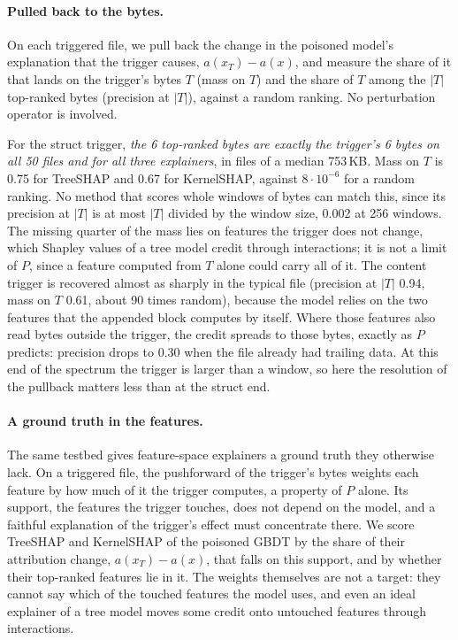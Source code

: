 \paragraph{Pulled back to the bytes.} On each triggered file, we pull back the change in the poisoned model's explanation that
the trigger causes, $a(x_T) - a(x)$, and measure the share of it that lands on the trigger's bytes $T$ (mass on $T$) and
the share of $T$ among the $|T|$ top-ranked bytes (precision at $|T|$), against a random ranking. No perturbation
operator is involved.

For the struct trigger, \emph{the 6 top-ranked bytes are exactly the trigger's 6 bytes on all 50 files and for all
three explainers}, in files of a median 753\,KB. Mass on $T$ is 0.75 for TreeSHAP and 0.67 for KernelSHAP, against
$8 \cdot 10^{-6}$ for a random ranking. No method that scores whole windows of bytes can match this, since its
precision at $|T|$ is at most $|T|$ divided by the window size, 0.002 at 256 windows. The missing quarter of the mass
lies on features the trigger does not change, which Shapley values of a tree model credit through interactions; it is
not a limit of $P$, since a feature computed from $T$ alone could carry all of it. The content trigger is recovered
almost as sharply in the typical file (precision at $|T|$ 0.94, mass on $T$ 0.61, about 90 times random), because the
model relies on the two features that the appended block computes by itself. Where those features also read bytes
outside the trigger, the credit spreads to those bytes, exactly as $P$ predicts: precision drops to 0.30 when the file
already had trailing data. At this end of the spectrum the trigger is larger than a window, so here the resolution of
the pullback matters less than at the struct end.

\paragraph{A ground truth in the features.} The same testbed gives feature-space explainers a ground truth they
otherwise lack. On a triggered file, the pushforward of the
trigger's bytes weights each feature by how much of it the trigger computes, a property of $P$ alone. Its support, the
features the trigger touches, does not depend on the model, and a faithful explanation of the trigger's effect must
concentrate there. We score TreeSHAP and KernelSHAP of the poisoned GBDT by the share of their attribution change,
$a(x_T) - a(x)$, that falls on this support, and by whether their top-ranked features lie in it. The weights themselves
are not a target: they cannot say which of the touched features the model uses, and even an ideal explainer of a tree
model moves some credit onto untouched features through interactions.

